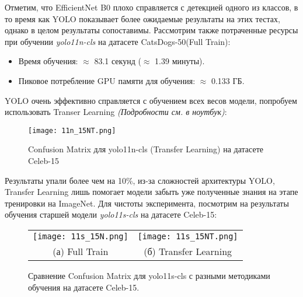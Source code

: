 \documentclass[14pt]{extarticle}
\begin{document}
Отметим, что EfficientNet B0 плохо справляется с детекцией одного из классов, в то время как YOLO показывает более ожидаемые результаты на этих тестах, однако в целом результаты сопоставимы. Рассмотрим также потраченные ресурсы при обучении \textit{yolo11n-cls} на датасете CatsDogs-50(Full Train):
\begin{itemize}[leftmargin=*, itemsep=0pt]
    \item Время обучения: $\approx$ 83.1 секунд ($\approx$ 1.39 минуты).
    \item Пиковое потребление GPU памяти для обучения: $\approx$ 0.133 ГБ.
\end{itemize}

YOLO очень эффективно справляется с обучением всех весов модели, попробуем использовать Transer Learning \textit{(Подробности см. в ноутбук)}:
\begin{figure}[H]
    \centering
    \texttt{[image: 11n\_15NT.png]}
    \caption{Confusion Matrix для yolo11n-cls (Transfer Learning) на датасете Celeb-15}
    \label{fig:имя_метки}
\end{figure}

Результаты упали более чем на 10\%, из-за сложностей архитектуры YOLO, Transfer Learning лишь помогает модели забыть уже полученные знания на этапе тренировки на ImageNet. Для чистоты эксперимента, посмотрим на результаты обучения старшей модели \textit{yolo11s-cls} на датасете Celeb-15:
\begin{figure}[H] 
    \centering 
    \begin{tabular}{cc} 
        \texttt{[image: 11s\_15N.png]} & 
        \texttt{[image: 11s\_15NT.png]} \\
        (а) Full Train  & 
        (б) Transfer Learning
    \end{tabular}

    \caption{Сравнение Confusion Matrix для yolo11s-cls с разными методиками обучения на датасете Celeb-15.}
\end{figure}
\end{document}
